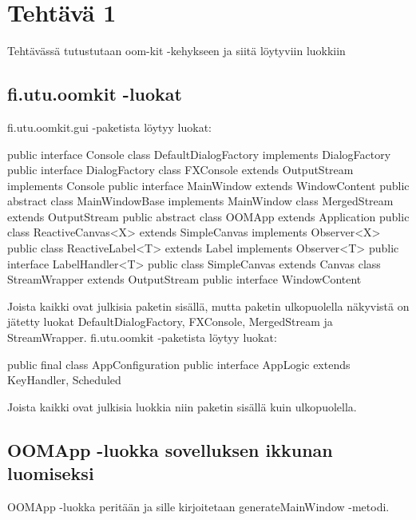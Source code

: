 
\chapter{Tehtävä 1 \label{chap:Teht=0000E4v=0000E4-1}}

Tehtävässä tutustutaan oom-kit -kehykseen ja siitä löytyviin luokkiin

\section{fi.utu.oomkit -luokat}

\label{fi.utu.oomkit -luokat}

fi.utu.oomkit.gui -paketista löytyy luokat:

\begin{javacode}
public interface Console {}
class DefaultDialogFactory implements DialogFactory {}
public interface DialogFactory {}
class FXConsole extends OutputStream implements Console {}
public interface MainWindow extends WindowContent {}
public abstract class MainWindowBase implements MainWindow {}
class MergedStream extends OutputStream {}
public abstract class OOMApp extends Application {}
public class ReactiveCanvas<X> extends SimpleCanvas implements Observer<X> {}
public class ReactiveLabel<T> extends Label implements Observer<T> {
	public interface LabelHandler<T> {}
}
public class SimpleCanvas extends Canvas {}
class StreamWrapper extends OutputStream {}
public interface WindowContent {}
\end{javacode}

Joista kaikki ovat julkisia paketin sisällä, mutta paketin ulkopuolella
näkyvistä on jätetty luokat DefaultDialogFactory, FXConsole, MergedStream ja
StreamWrapper. fi.utu.oomkit -paketista löytyy luokat:

\begin{javacode}
public final class AppConfiguration {}
public interface AppLogic extends KeyHandler, Scheduled {}
\end{javacode}

Joista kaikki ovat julkisia luokkia niin paketin sisällä kuin ulkopuolella.

\section{OOMApp -luokka sovelluksen ikkunan luomiseksi}

\label{OOMApp -luokka sovelluksen ikkunan luomiseksi}
 
OOMApp -luokka peritään ja sille kirjoitetaan generateMainWindow -metodi.

